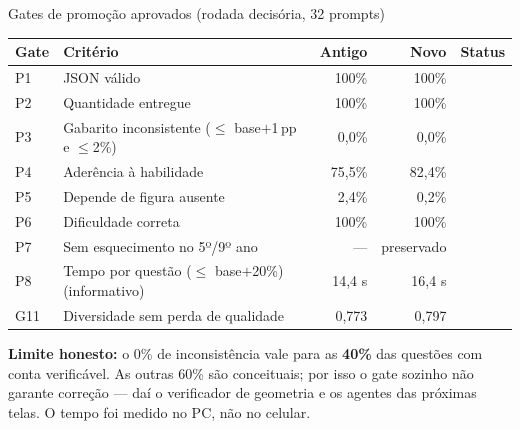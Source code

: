 \documentclass[aspectratio=169,11pt]{beamer}
\newcommand{\okmark}{{\color{okgreen}\faCheckCircle}}
\begin{document}
\begin{frame}{Gates de promoção aprovados (rodada decisória, 32 prompts)}
  \footnotesize
  \begin{tabularx}{\textwidth}{@{}l X r r c@{}}
    \toprule
    \textbf{Gate} & \textbf{Critério} & \textbf{Antigo} & \textbf{Novo} & \textbf{Status} \\
    \midrule
    P1  & JSON válido                                     & 100\%   & 100\%   & \okmark \\
    P2  & Quantidade entregue                             & 100\%   & 100\%   & \okmark \\
    P3  & Gabarito inconsistente ($\le$ base$+$1\,pp e $\le$2\%) & 0,0\%   & 0,0\%   & \okmark \\
    P4  & Aderência à habilidade                          & 75,5\%  & 82,4\%  & \okmark \\
    P5  & Depende de figura ausente                       & 2,4\%   & 0,2\%   & \okmark \\
    P6  & Dificuldade correta                             & 100\%   & 100\%   & \okmark \\
    P7  & Sem esquecimento no 5º/9º ano                   & ---     & preservado & \okmark \\
    P8  & Tempo por questão ($\le$ base$+$20\%) {\tiny(informativo)} & 14,4 s & 16,4 s & \okmark \\
    G11 & Diversidade sem perda de qualidade              & 0,773   & 0,797   & \okmark \\
    \bottomrule
  \end{tabularx}

  \vspace{5pt}
  \begin{tcolorbox}[colback=lightorange, colframe=warnorange, boxrule=0.5pt, arc=2pt, left=5pt, right=5pt, top=2pt, bottom=2pt]
    \scriptsize\textbf{Limite honesto:} o 0\% de inconsistência vale para as \textbf{40\%} das questões com conta verificável. As outras 60\% são conceituais; por isso o gate sozinho não garante correção --- daí o verificador de geometria e os agentes das próximas telas. O tempo foi medido no PC, não no celular.
  \end{tcolorbox}
\end{frame}

\end{document}

